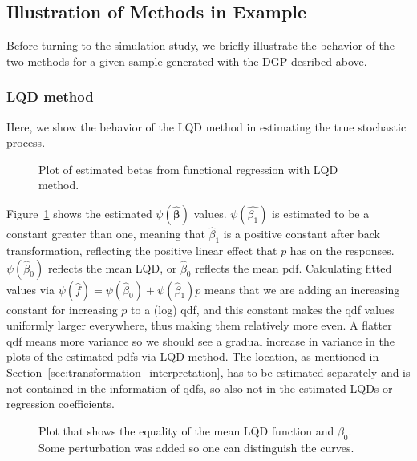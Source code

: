 \subsection{Illustration of Methods in Example}
\label{sec:app_illustration}
Before turning to the simulation study, we briefly illustrate the behavior of the
two methods for a given sample generated with the DGP desribed above.

\subsubsection{LQD method}
\label{sec:app_lqd}
Here, we show the behavior of the LQD method in estimating the true stochastic process.

\begin{figure}[h!]
    \centering
    \resizebox{1\textwidth}{!}{}
    \caption[Estimated betas in LQD functional regression]{Plot of estimated betas from
    functional regression with LQD method.}
    \label{fig:betas}
\end{figure}
Figure~\ref{fig:betas} shows the estimated $\psi(\hat{\boldsymbol{\beta}})$ values. $\psi(\hat{\beta_1})$
is estimated to be a constant greater than one, meaning that $\hat{\beta}_1$ is a positive
constant after back transformation, reflecting the positive linear effect that $p$ has
on the responses. $\psi(\hat{\beta}_0)$ reflects the mean LQD, or $\hat{\beta}_0$ reflects
the mean pdf. Calculating fitted values via $\psi(\hat{f}) = \psi(\hat{\beta}_0) + \psi(\hat{\beta}_1) p$
means that we are adding an increasing constant for increasing $p$ to a (log) qdf, and
this constant makes the qdf values uniformly larger everywhere, thus making them relatively
more even. A flatter qdf means more variance so we should see a gradual increase in
variance  in the plots of the estimated pdfs via LQD method. The location, as mentioned
in Section~\ref{sec:transformation_interpretation}, has to be estimated separately and is not
contained in the information of qdfs, so also not in the estimated LQDs or regression
coefficients.
\begin{figure}[h!]
    \centering
    \resizebox{1\textwidth}{!}{}
    \caption[Equality of mean LQD function and $\psi(\hat{\beta}_0)$]{Plot that shows the equality
    of the mean LQD function and $\beta_0$. Some perturbation was added so one can
    distinguish the curves.}
    \label{fig:beta0vsmean}
\end{figure}
